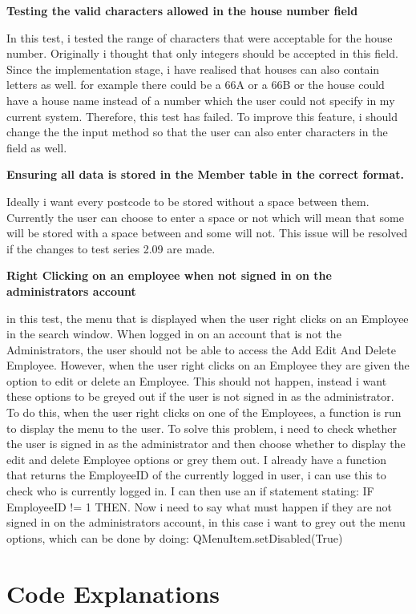 \textbf{Testing the valid characters allowed in the house number field}

In this test, i tested the range of characters that were acceptable for the house number. Originally i thought that only integers should be accepted in this field. Since the implementation stage, i have realised that houses can also contain letters as well. for example there could be a 66A or a 66B or the house could have a house name instead of a number which the user could not specify in my current system. Therefore,  this test has failed. To improve this feature, i should change the the input method so that the user can also enter characters in the field as well.

\textbf{Ensuring all data is stored in the Member table in the correct format.}

 Ideally i want every postcode to be stored without a space between them. Currently the user can choose to enter a space or not which will mean that some will be stored with a space between and some will not. This issue will be resolved if the changes to test series 2.09 are made.

\textbf{Right Clicking on an employee when not signed in on the administrators account}

in this test, the menu that is displayed when the user right clicks on an Employee in the search window. When logged in on an account that is not the Administrators, the user should not be able to access the Add Edit And Delete Employee. However, when the user right clicks on an Employee they are given the option to edit or delete an Employee. This should not happen, instead i want these options to be greyed out if the user is not signed in as the administrator. To do this, when the user right clicks on one of the Employees, a function is run to display the menu to the user. To solve this problem, i need to check whether the user is signed in as the administrator and then choose whether to display the edit and delete Employee options or grey them out. I already have a function that returns the EmployeeID of the currently logged in user, i can use this to check who is currently logged in. I can then use an if statement stating: IF EmployeeID != 1 THEN. Now i need to say what must happen if they are not signed in on the administrators account, in this case i want to grey out the menu options, which can be done by doing: QMenuItem.setDisabled(True)
\pagebreak

\section{Code Explanations}


